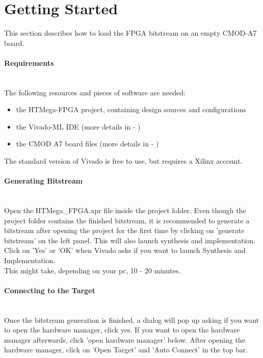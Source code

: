 \section{Getting Started}
This section describes how to load the FPGA bitstream on an empty CMOD-A7 board.
\paragraph{Requirements}~\\
The following resources and pieces of software are needed:
\begin{itemize}
    \item the HTMega-FPGA project, containing design sources and configurations
    \item the Vivado-ML IDE (more details in \cite{vivado} - )
    \item the CMOD A7 board files (more details in \cite{cmod-a7-board-files} - )
\end{itemize}
The standard version of Vivado is free to use, but requires a Xilinx account.

\paragraph{Generating Bitstream}~\\
Open the HTMega\_FPGA.xpr file inside the project folder.
Even though the project folder contains the finished bitstream, it is recommended to generate a bitstream after opening the project for the first time by clicking on 'generate bitstream' on the left panel.
This will also launch synthesis and implementation. Click on 'Yes' or 'OK' when Vivado asks if you want to launch Synthesis and Implementation.\\
This might take, depending on your pc, 10 - 20 minutes.  

\paragraph{Connecting to the Target}~\\
Once the bitstream generation is finished, a dialog will pop up asking if you want to open the hardware manager, click yes.
If you want to open the hardware manager afterwards, click 'open hardware manager' below.
After opening the hardware manager, click on 'Open Target' and 'Auto Connect' in the top bar.
\pagebreak


